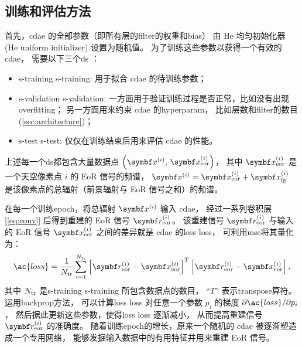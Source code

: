 \subsection{训练和评估方法}
\label{sec:train-eval}

首先，\ac{cdae} 的全部参数（即所有层的\ac{filter}的权重和\ac{bias}）
由 He 均匀初始化器 (He uniform initializer)\cite{he2015} 设置为随机值。
为了训练这些参数以获得一个有效的 \ac{cdae}，
需要以下三个\ac{ds} \cite{ripley1996}：
\begin{itemize}
  \item \acl{s-training} \ac{s-training}:
    用于拟合 \ac{cdae} 的待训练参数；
  \item \acl{s-validation} \ac{s-validation}:
    一方面用于验证训练过程是否正常，比如没有出现\ac{overfitting}；
    另一方面用来约束 \ac{cdae} 的\ac{hyperparam}，
    比如层数和\ac{filter}的数目 (\autoref{sec:architecture})；
  \item \acl{s-test} \ac{s-test}:
    仅仅在训练结束后用来评估 \ac{cdae} 的性能。
\end{itemize}
上述每一个\ac{ds}都包含大量数据点
$\left( \B{x}^{(i)}, \,\B{x}^{(i)}_{\R{eor}} \right)$，
其中 $\B{x}^{(i)}_{\R{eor}}$ 是一个天空像素点 $i$ 的 EoR 信号的频谱，
$\B{x}^{(i)} = \B{x}^{(i)}_{\R{eor}} + \B{x}^{(i)}_{\R{fg}}$
是该像素点的总辐射（前景辐射与 EoR 信号之和）的频谱。

在每一个训练\ac{epoch}，将总辐射 $\B{x}^{(i)}$ 输入 \ac{cdae}，
经过一系列卷积层 [\autoref{eq:conv}]
后得到重建的 EoR 信号 $\B{r}^{(i)}_{\R{eor}}$。
该重建信号 $\B{r}^{(i)}_{\R{eor}}$ 与输入的 EoR 信号 $\B{x}^{(i)}_{\R{eor}}$
之间的差异就是 \ac{cdae} 的\acl{loss} \ac{loss}，
可利用\ac{mse}将其量化为：
\begin{equation}
  \label{eq:loss}
  \ac{loss} = \frac{1}{N_{\R{tr}}} \sum_{i=1}^{N_{\R{tr}}}
    \left[ \B{r}_{\R{eor}}^{(i)} - \B{x}_{\R{eor}}^{(i)} \right]^T
    \left[ \B{r}_{\R{eor}}^{(i)} - \B{x}_{\R{eor}}^{(i)} \right] ,
\end{equation}
其中 $N_{\mathrm{tr}}$ 是\acl{s-training} \ac{s-training} 所包含数据点的数目，
\enquote{$T$} 表示\ac{transpose}算符。
运用\ac{backprop}方法\cite{rumelhart1986,leCun1998bp}，
可以计算\acl{loss} \ac{loss} 对任意一个参数 $p_i$ 的梯度
$\partial \ac{loss} / \partial p_i$，
然后据此更新这些参数，使得\acl{loss} \ac{loss} 逐渐减小，
从而提高重建信号 $\B{r}^{(i)}_{\R{eor}}$ 的准确度。
随着训练\ac{epoch}的增长，原来一个随机的 \ac{cdae} 被逐渐塑造成一个专用网络，
能够发掘输入数据中的有用特征并用来重建 EoR 信号。

